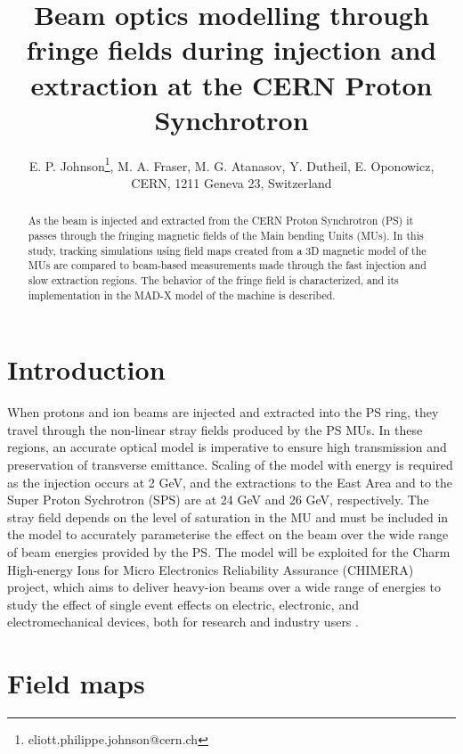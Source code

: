 \documentclass[a4paper,
               biblatex,     %
               keeplastbox,   %
               ]{jacow}
\begin{document}
\title{Beam optics modelling through fringe fields during injection and extraction at the CERN Proton Synchrotron}

\author{E. P. Johnson\thanks{eliott.philippe.johnson@cern.ch}, M. A. Fraser, M. G. Atanasov, Y. Dutheil, E. Oponowicz,\\ CERN, 1211 Geneva 23, Switzerland}
	
\maketitle

%
\begin{abstract}
As the beam is injected and extracted from the CERN Proton Synchrotron (PS) it passes through the fringing magnetic fields of the Main bending Units (MUs). In this study, tracking simulations using field maps created from a 3D magnetic model of the MUs are compared to beam-based measurements made through the fast injection and slow extraction regions. The behavior of the fringe field is characterized, and its implementation in the MAD-X \cite{noauthor_mad_nodate} model of the machine is described.
\end{abstract}


\section{Introduction}
When protons and ion beams are injected and extracted into the PS ring, they travel through the non-linear stray fields produced by the PS MUs. In these regions, an accurate optical model is imperative to ensure high transmission and preservation of transverse emittance. Scaling of the model with energy is required as the injection occurs at 2 GeV, and the extractions to the East Area and to the Super Proton Sychrotron (SPS) are at 24 GeV and 26 GeV, respectively. The stray field depends on the level of saturation in the MU and must be included in the model to accurately parameterise the effect on the beam over the wide range of beam energies provided by the PS. The model will be exploited for the Charm High-energy Ions for Micro Electronics Reliability Assurance (CHIMERA) project, which aims to deliver heavy-ion beams over a wide range of energies to study the effect of single event effects on electric, electronic, and electromechanical devices, both for research and industry users \cite{fraser:ipac22-wepost012}.

\section{Field maps}
\end{document}
